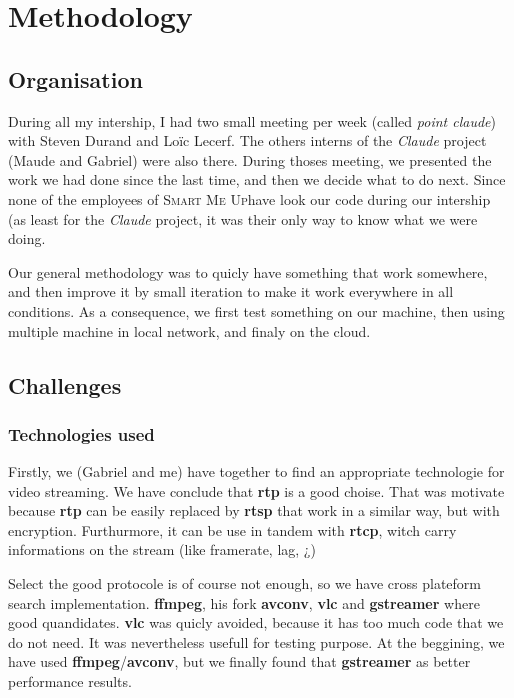 \documentclass[a4paper,11pt]{custom}
\newcommand{\smu}{\textsc{Smart Me Up}}
\newcommand{\rtp}{\textbf{rtp}}
\newcommand{\rtcp}{\textbf{rtcp}}
\newcommand{\rtsp}{\textbf{rtsp}}
\newcommand{\vlc}{\textbf{vlc}}
\newcommand{\avconv}{\textbf{avconv}}
\newcommand{\ffmpeg}{\textbf{ffmpeg}}
\newcommand{\gstreamer}{\textbf{gstreamer}}
\newcommand{\claude}{\textit{Claude}}
\begin{document}
\chapter{Methodology}
\label{chap:Methodology}

\section{Organisation}

During all my intership, I had two small meeting per week (called \textit{point
claude}) with Steven Durand and Loïc Lecerf. The others interns of the \claude{}
project (Maude and Gabriel) were also there. During thoses meeting, we presented
the work we had done since the last time, and then we decide what to do next.
Since none of the employees of \smu have look our code during our intership (as
least for the \claude{} project, it was their only way to know what we were
doing.

Our general methodology was to quicly have something that work somewhere, and
then improve it by small iteration to make it work everywhere in all conditions.
As a consequence, we first test something on our machine, then using multiple
machine in local network, and finaly on the cloud.


\section{Challenges}
\subsection{Technologies used}

Firstly, we (Gabriel and me) have together to find an appropriate technologie
for video streaming. We have conclude that \rtp{} is a good choise. That was
motivate because \rtp{} can be easily replaced by \rtsp{} that work in a similar
way, but with encryption. Furthurmore, it can be use in tandem with \rtcp, witch
carry informations on the stream (like framerate, lag, ¿)

Select the good protocole is of course not enough, so we have cross plateform
search implementation. \ffmpeg, his fork \avconv, \vlc{} and \gstreamer{} where
good quandidates. \vlc{} was quicly avoided, because it has too much code that
we do not need. It was nevertheless usefull for testing purpose. At the
beggining, we have used \ffmpeg/\avconv, but we finally found that \gstreamer{}
as better performance results.
\end{document}
